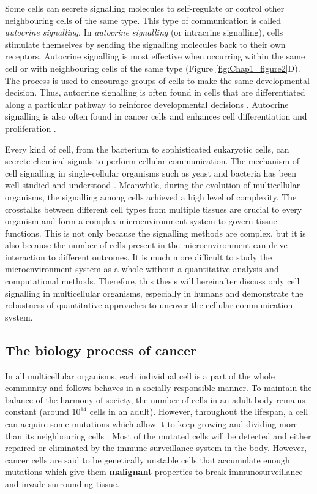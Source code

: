 Some cells can secrete signalling molecules to self-regulate or control other neighbouring cells of the same type. This type of communication is called \textit{autocrine signalling}. In \textit{autocrine signalling} (or intracrine signalling), cells stimulate themselves by sending the signalling molecules back to their own receptors. Autocrine signalling is most effective when occurring within the same cell or with neighbouring cells of the same type (Figure \ref{fig:Chap1_figure2}D). The process is used to encourage groups of cells to make the same developmental decision. Thus, autocrine signalling is often found in cells that are differentiated along a particular pathway to reinforce developmental decisions \cite{alberts2018molecular}. Autocrine signalling is also often found in cancer cells and enhances cell differentiation and proliferation \cite{sporn1985autocrine}.  

Every kind of cell, from the bacterium to sophisticated eukaryotic cells, can secrete chemical signals to perform cellular communication. The mechanism of cell signalling in single-cellular organisms such as yeast and bacteria has been well studied and understood \cite{alberts2018molecular}. Meanwhile, during the evolution of multicellular organisms, the signalling among cells achieved a high level of complexity. The crosstalks between different cell types from multiple tissues are crucial to every organism and form a complex microenvironment system to govern tissue functions. This is not only because the signalling methods are complex, but it is also because the number of cells present in the microenvironment can drive interaction to different outcomes. It is much more difficult to study the microenvironment system as a whole without a quantitative analysis and computational methods. Therefore, this thesis will hereinafter discuss only cell signalling in multicellular organisms, especially in humans and demonstrate the robustness of quantitative approaches to uncover the cellular communication system. 

\subsection{The biology process of cancer}
In all multicellular organisms, each individual cell is a part of the whole community and follows behaves in a socially responsible manner. To maintain the balance of the harmony of society, the number of cells in an adult body remains constant (around $10^{14}$ cells in an adult). However, throughout the lifespan, a cell can acquire some mutations which allow it to keep growing and dividing more than its neighbouring cells \cite{alberts2018molecular, greaves2012clonal}. Most of the mutated cells will be detected and either repaired or eliminated by the immune surveillance system in the body. However, cancer cells are said to be genetically unstable cells that accumulate enough mutations which give them \textbf{malignant} properties to break immunosurveillance and invade surrounding tissue. 

